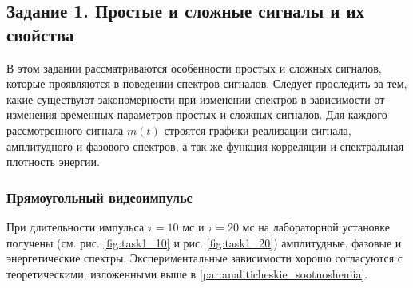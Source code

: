\subsection{Задание 1. Простые и сложные сигналы и их свойства}
В этом задании рассматриваются особенности простых и сложных
сигналов, которые проявляются в поведении спектров сигналов. Следует
проследить за тем, какие существуют закономерности при изменении спектров
в зависимости от изменения временных параметров простых и сложных
сигналов.
Для каждого рассмотренного сигнала $m(t)$ строятся графики реализации
сигнала, амплитудного и фазового спектров, а так же функция корреляции и
спектральная плотность энергии.



\subsubsection{Прямоугольный видеоимпульс}

При длительности импульса $\tau= 10$ мс и  $\tau=20$ мс на лабораторной
установке получены (см. рис. \ref{fig:task1_10} и рис.
\ref{fig:task1_20}) амплитудные, фазовые и энергетические спектры.
Экспериментальные зависимости хорошо согласуются с теоретическими, изложенными
выше в \ref{par:analiticheskie_sootnosheniia}.



